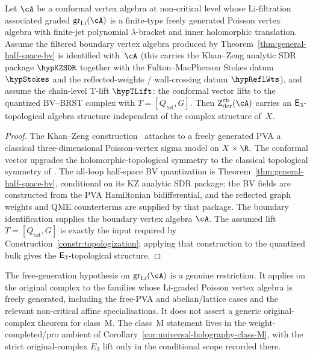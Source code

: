 \begin{theorem}\label{thm:E3-topological-free-PVA}
Let $\cA$ be a conformal vertex algebra at non-critical level
whose Li-filtration associated graded $\operatorname{gr}_{\mathrm{Li}}(\cA)$
is a finite-type freely generated Poisson vertex algebra with
finite-jet polynomial $\lambda$-bracket and inner holomorphic
translation. Assume the filtered boundary vertex algebra produced by
Theorem~\ref{thm:general-half-space-bv} is identified with~\(\cA\)
(this carries the Khan--Zeng analytic SDR package $\hypKZSDR$ together
with the Fulton--MacPherson Stokes datum $\hypStokes$ and the
reflected-weights / wall-crossing datum $\hypReflWts$), and assume
the chain-level T-lift $\hypTLift$: the conformal vector lifts to
the quantized BV--BRST complex with $T=[Q_{\mathrm{tot}},G]$.
Then $\Zder^{\mathrm{ch}}(\cA)$ carries an
$\mathsf{E}_3$-topological algebra structure independent of the complex
structure of~$X$.
\end{theorem}

\begin{proof}
The Khan--Zeng construction~\cite{KZ25} attaches to a freely
generated PVA a classical three-dimensional Poisson-vertex sigma model
on $X \times \R$. The conformal vector upgrades the
holomorphic-topological symmetry to the classical topological symmetry
of \cite[Theorem~4.1]{KZ25}. The all-loop half-space BV quantization
is Theorem~\ref{thm:general-half-space-bv}, conditional on its KZ
analytic SDR package: the BV fields are constructed from the PVA
Hamiltonian bidifferential, and the reflected graph weights and QME
counterterms are supplied by that package.
The boundary identification supplies the boundary vertex algebra
\(\cA\). The assumed lift $T=[Q_{\mathrm{tot}},G]$ is exactly the
input required by Construction~\ref{constr:topologization}; applying
that construction to the quantized bulk gives the
$\mathsf{E}_3$-topological structure.
\end{proof}

\begin{remark}
\label{rem:E3-top-free-PVA-scope}
The free-generation hypothesis on $\operatorname{gr}_{\mathrm{Li}}(\cA)$
is a genuine restriction. It applies on the original complex to the
families whose Li-graded Poisson vertex algebra is freely generated,
including the free-PVA and abelian/lattice cases and the relevant
non-critical affine specialisations. It does not assert a generic
original-complex theorem for class~M. The class~M statement lives in
the weight-completed/pro ambient of
Corollary~\ref*{cor:universal-holography-class-M}, with the strict
original-complex $E_3$ lift only in the conditional scope recorded
there.
\end{remark}

